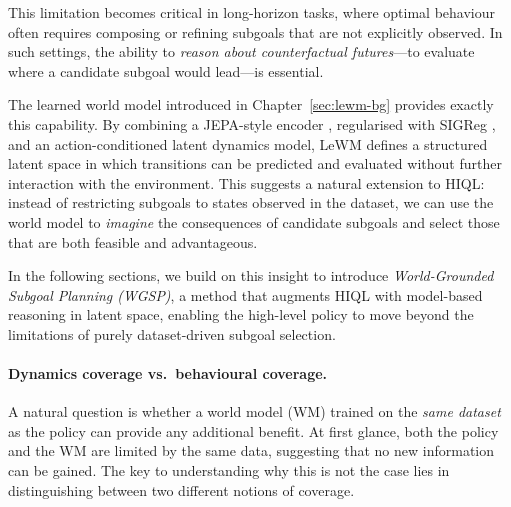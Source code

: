 This limitation becomes critical in long-horizon tasks, where optimal behaviour often requires composing or refining subgoals that are not explicitly observed. In such settings, the ability to \emph{reason about counterfactual futures}—to evaluate where a candidate subgoal would lead—is essential.

The learned world model introduced in Chapter~\ref{sec:lewm-bg} provides exactly this capability. By combining a JEPA-style encoder \citep{jepa}, regularised with SIGReg \citep{lejepa}, and an action-conditioned latent dynamics model, LeWM defines a structured latent space in which transitions can be predicted and evaluated without further interaction with the environment. This suggests a natural extension to HIQL: instead of restricting subgoals to states observed in the dataset, we can use the world model to \emph{imagine} the consequences of candidate subgoals and select those that are both feasible and advantageous.

In the following sections, we build on this insight to introduce
\emph{World-Grounded Subgoal Planning (WGSP)}, a method that augments HIQL with model-based reasoning in latent space, enabling the high-level policy to move beyond the limitations of purely dataset-driven subgoal selection.


\paragraph{Dynamics coverage vs.\ behavioural coverage.}
A natural question is whether a world model (WM) trained on the
\emph{same dataset} as the policy can provide any additional benefit.
At first glance, both the policy and the WM are limited by the same
data, suggesting that no new information can be gained. The key to
understanding why this is not the case lies in distinguishing between
two different notions of coverage.

